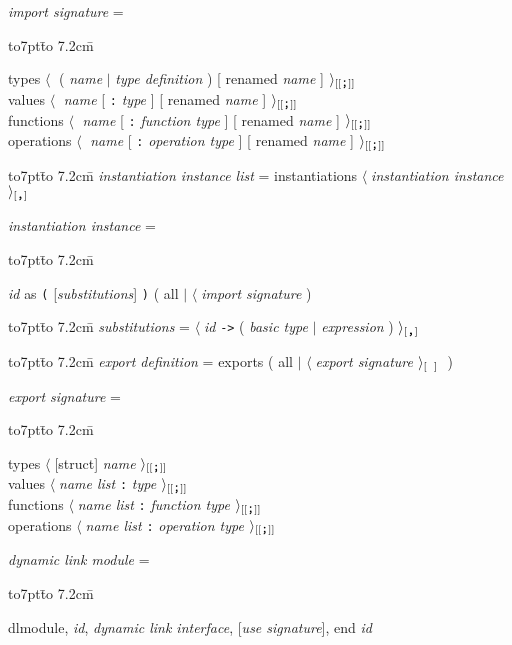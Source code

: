 \documentclass[a4paper]{jsarticle}
\newcommand{\K}[1]{{\sf #1}}
\newcommand{\id}[1]{{\it #1\/}}
\newcommand{\AL}{$\langle\;$}
\newcommand{\AR}[1]{$\rangle_{[\hbox{\tt#1}]}\;$}
\newcommand{\ARX}[1]{$\rangle_{[[\hbox{\tt#1}]]}\;$}
\newcommand{\lp}{{\tt(}}
\newcommand{\rp}{{\tt)}}
\newcommand{\RMor}{{$|$}}
\newenvironment{tabbingone}[0]{
\begingroup
  \parskip=0pt
  \topsep=0pt
  \partopsep=0pt
  \begin{tabbing}
    \hbox to7pt{}\=%
    \hbox to 7.2cm{}\=%
    \kill
    \+ %
    \kill
}{
  \end{tabbing}
\endgroup}
\begin{document}
\id{import signature} = 
\begin{tabbingone}
  \K{types} \AL{} ( \id{name} \RMor{} \id{type definition} ) [ \K{renamed} \id{name} ] \ARX{;}  \> \\
  \K{values} \AL{} \id{name} [ {\tt:} \id{type} ] [ \K{renamed} \id{name} ] \ARX{;}  \> \\
  \K{functions} \AL{} \id{name} [ {\tt:} \id{function type} ] [ \K{renamed} \id{name} ] \ARX{;}  \> \\
  \K{operations} \AL{} \id{name} [ {\tt:} \id{operation type} ] [ \K{renamed} \id{name} ] \ARX{;} \> \\
\end{tabbingone}

\begin{tabbingone}\-\kill
\id{instantiation instance list} = 
  \K{instantiations} \AL \id{instantiation instance} \AR{,} \> \\
\end{tabbingone}

\id{instantiation instance} = 
\begin{tabbingone}
  \id{id} \K{as} \lp{} [\id{substitutions}] \rp{}
  ( \K{all} \RMor{} \AL \id{import signature} )\\
\end{tabbingone}

\begin{tabbingone}\-\kill
\id{substitutions} = 
  \AL \id{id} {\tt->} ( \id{basic type} \RMor{} \id{expression} ) \AR{,}  \\
\end{tabbingone}

\begin{tabbingone}\-\kill
\id{export definition} =
  \K{exports} ( \K{all} \RMor{} \AL \id{export signature} \AR{\ } )\\
\end{tabbingone}

\id{export signature} = 
\begin{tabbingone}
  \K{types} \AL [\K{struct}] \id{name} \ARX{;}   \> \\
  \K{values} \AL \id{name list} {\tt:} \id{type} \ARX{;}  \> \\
  \K{functions} \AL \id{name list} {\tt:} \id{function type} \ARX{;}  \> \\
  \K{operations} \AL \id{name list} {\tt:} \id{operation type} \ARX{;}  \> \\
\end{tabbingone}

\id{dynamic link module} =
\begin{tabbingone}
  \K{dlmodule}, \id{id},
  \id{dynamic link interface}, 
  [\id{use signature}],
  \K{end} \id{id}    \\
\end{tabbingone}
\end{document}
